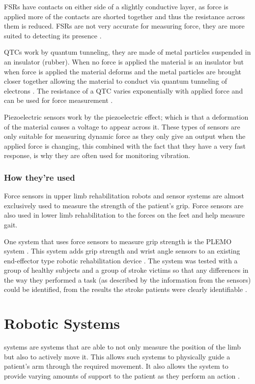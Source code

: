 \documentclass[journal]{IEEEtran}
\begin{document}
FSRs have contacts on either side of a slightly conductive layer, as force is applied more of 
the contacts are shorted together and thus the resistance across them is reduced. FSRs 
are not very accurate for measuring force, they are more suited to detecting its presence \cite{FSR}.

QTCs work by quantum tunneling, they are made of metal particles suspended in an insulator 
(rubber). When no force is applied the material is an insulator but when force is applied the 
material deforms and the metal particles are brought closer together allowing the material to 
conduct via quantum tunneling of electrons \cite{QTCs}. The resistance of a QTC varies 
exponentially with applied force and can be used for force measurement \cite{QTCs}.

Piezoelectric sensors work by the piezoelectric effect; which is that a deformation of the material 
causes a voltage to appear across it. These types of sensors are only suitable for measuring 
dynamic force as they only give an output when the applied force is changing, this combined 
with the fact that they have a very fast response, is why they are often used for monitoring 
vibration.

\subsubsection{How they're used}
Force sensors in upper limb rehabilitation robots and sensor systems are almost exclusively 
used to measure the strength of the patient's grip. Force sensors are also used in lower 
limb rehabilitation to the forces on the feet and help measure gait.

One system that uses force sensors to measure grip strength is the PLEMO system \cite{PLEMO}. 
This system adds grip strength and wrist angle sensors to an existing end-effector type 
robotic rehabilitation device \cite{PLEMO}. The system was tested with a group of healthy subjects 
and a group of stroke victims so that any differences in the way they performed a task 
(as described by the information from the sensors) could be identified, from the results 
the stroke patients were clearly identifiable \cite{PLEMO}.


\section{Robotic Systems}
 systems are systems that are able to not only measure the position 
of the limb but also to actively move it. This allows such systems to physically guide a patient's 
arm through the required movement. It also allows the system to provide varying amounts of 
support to the patient as they perform an action \cite{AdvancesPush}.
\end{document}
